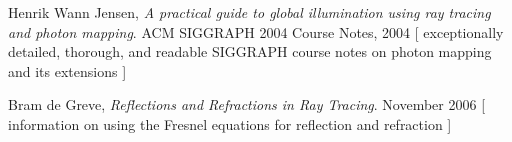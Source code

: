 \documentclass{article}
\begin{document}
\begin{thebibliography}{9}

 Henrik Wann Jensen,
 \emph{A practical guide to global illumination using ray tracing and photon mapping}.
 ACM SIGGRAPH 2004 Course Notes, 2004 [ exceptionally detailed, thorough, and readable SIGGRAPH course notes on photon mapping and its extensions ]

Bram de Greve, \emph{Reflections and Refractions in Ray Tracing}. November 2006
[ information on using the Fresnel equations for reflection and refraction ]

\end{thebibliography}
\end{document}
